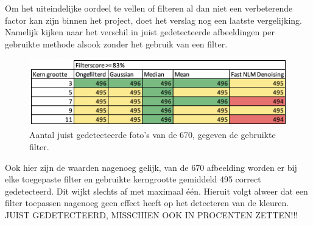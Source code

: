 Om het uiteindelijke oordeel te vellen of filteren al dan niet een verbeterende factor kan zijn binnen het project, doet het verslag nog een laatste vergelijking. Namelijk kijken naar het verschil in juist gedetecteerde afbeeldingen per gebruikte methode alsook zonder het gebruik van een filter.

\begin{figure}[h!]
  \includegraphics[width=\linewidth]{img/filternofilter}
  \caption{Aantal juist gedetecteerde foto's van de 670, gegeven de gebruikte filter.}
  \label{fig:filternofilter}
\end{figure}

Ook hier zijn de waarden nagenoeg gelijk, van de 670 afbeelding worden er bij elke toegepaste filter en gebruikte kerngrootte gemiddeld 495 correct gedetecteerd. Dit wijkt slechts af met maximaal één. Hieruit volgt alweer dat een filter toepassen nagenoeg geen effect heeft op het detecteren van de kleuren. JUIST GEDETECTEERD, MISSCHIEN OOK IN PROCENTEN ZETTEN!!!